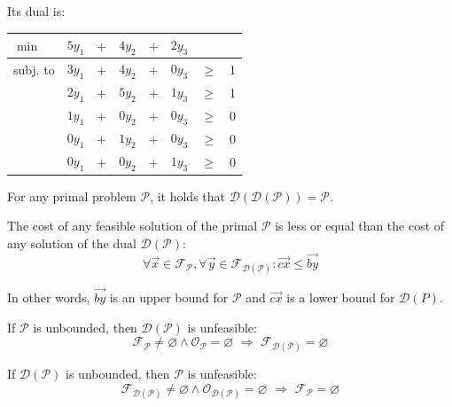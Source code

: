\begin{description}
\begin{example}
            Its dual is:
            \begin{center}
                \begin{tabular}{lccccccc}
                    \toprule
                    $\min$ & $5y_1$ & $+$ & $4y_2$ & $+$ & $2y_3$ \\
                    \midrule
                    subj. to & $3y_1$ & $+$ & $4y_2$ & $+$ & \color{lightgray}$0y_3$ & $\geq$ & 1 \\
                             & $2y_1$ & $+$ & $5y_2$ & $+$ & $1y_3$ & $\geq$ & 1 \\
                             & $1y_1$ & $+$ & \color{lightgray}$0y_2$ & $+$ & \color{lightgray}$0y_3$ & $\geq$ & 0 \\
                             & \color{lightgray}$0y_1$ & $+$ & $1y_2$ & $+$ & \color{lightgray}$0y_3$ & $\geq$ & 0 \\
                             & \color{lightgray}$0y_1$ & $+$ & \color{lightgray}$0y_2$ & $+$ & $1y_3$ & $\geq$ & 0 \\
                    \bottomrule
                \end{tabular}
            \end{center}
        \end{example}
\end{description}

\begin{theorem}
    For any primal problem $\mathcal{P}$, it holds that $\mathcal{D}(\mathcal{D}(\mathcal{P})) = \mathcal{P}$.
\end{theorem}

\begin{theorem} 
    The cost of any feasible solution of the primal $\mathcal{P}$ is less or equal than the cost of any solution of the dual $\mathcal{D}(\mathcal{P})$:
    \[ \forall \vec{x} \in \mathcal{F}_{\mathcal{P}}, \forall \vec{y} \in \mathcal{F}_{\mathcal{D}(\mathcal{P})}: \vec{cx} \leq \vec{by} \]

    In other words, $\vec{by}$ is an upper bound for $\mathcal{P}$ and $\vec{cx}$ is a lower bound for $\mathcal{D}(P)$.

    \begin{corollary}
        If $\mathcal{\mathcal{P}}$ is unbounded, then $\mathcal{D}(\mathcal{P})$ is unfeasible:
        \[ \mathcal{F}_{\mathcal{P}} \neq \varnothing \land \mathcal{O}_{\mathcal{P}} = \varnothing \,\,\Rightarrow\,\, \mathcal{F}_{\mathcal{D}(\mathcal{P})} = \varnothing \]
    \end{corollary}

    \begin{corollary}
        If $\mathcal{D}(\mathcal{P})$ is unbounded, then $\mathcal{P}$ is unfeasible:
        \[ \mathcal{F}_{\mathcal{D}(\mathcal{P})} \neq \varnothing \land \mathcal{O}_{\mathcal{D}(\mathcal{P})} = \varnothing \,\,\Rightarrow\,\, \mathcal{F}_{\mathcal{P}} = \varnothing \]
    \end{corollary}
\end{theorem}

